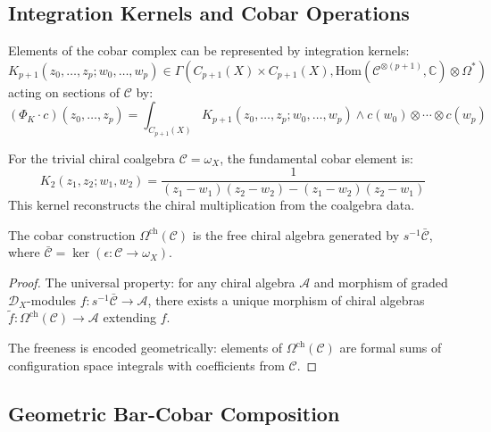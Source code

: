 \subsection{Integration Kernels and Cobar Operations}

\begin{definition}\label{def:cobar-kernel}
Elements of the cobar complex can be represented by integration kernels:
\[
K_{p+1}(z_0, \ldots, z_p; w_0, \ldots, w_p) \in \Gamma\left(C_{p+1}(X) \times C_{p+1}(X), \text{Hom}(\mathcal{C}^{\otimes(p+1)}, \mathbb{C}) \otimes \Omega^*\right)
\]
acting on sections of $\mathcal{C}$ by:
\[
(\Phi_K \cdot c)(z_0, \ldots, z_p) = \int_{C_{p+1}(X)} K_{p+1}(z_0, \ldots, z_p; w_0, \ldots, w_p) \wedge c(w_0) \otimes \cdots \otimes c(w_p)
\]
\end{definition}

\begin{example}\label{ex:fundamental-cobar}
For the trivial chiral coalgebra $\mathcal{C} = \omega_X$, the fundamental cobar element is:
\[
K_2(z_1, z_2; w_1, w_2) = \frac{1}{(z_1 - w_1)(z_2 - w_2) - (z_1 - w_2)(z_2 - w_1)}
\]
This kernel reconstructs the chiral multiplication from the coalgebra data.
\end{example}

\begin{theorem}\label{thm:cobar-free}
The cobar construction $\Omega^{\text{ch}}(\mathcal{C})$ is the free chiral algebra generated by $s^{-1}\bar{\mathcal{C}}$, where $\bar{\mathcal{C}} = \ker(\epsilon: \mathcal{C} \to \omega_X)$.
\end{theorem}

\begin{proof}
The universal property: for any chiral algebra $\mathcal{A}$ and morphism of graded $\mathcal{D}_X$-modules $f: s^{-1}\bar{\mathcal{C}} \to \mathcal{A}$, there exists a unique morphism of chiral algebras $\tilde{f}: \Omega^{\text{ch}}(\mathcal{C}) \to \mathcal{A}$ extending $f$.

The freeness is encoded geometrically: elements of $\Omega^{\text{ch}}(\mathcal{C})$ are formal sums of configuration space integrals with coefficients from $\mathcal{C}$.
\end{proof}

\subsection{Geometric Bar-Cobar Composition}

